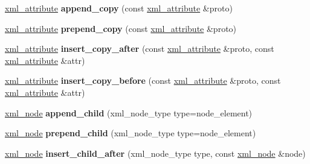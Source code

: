 \begin{DoxyCompactItemize}
\item 
\hypertarget{classpugi_1_1xml__node_a4c151e6665c6bfa614fe80d177fd5396}{}\hyperlink{classpugi_1_1xml__attribute}{xml\+\_\+attribute} {\bfseries append\+\_\+copy} (const \hyperlink{classpugi_1_1xml__attribute}{xml\+\_\+attribute} \&proto)\label{classpugi_1_1xml__node_a4c151e6665c6bfa614fe80d177fd5396}

\item 
\hypertarget{classpugi_1_1xml__node_abd0f80e4d5bc938a27b50d37a0c7865b}{}\hyperlink{classpugi_1_1xml__attribute}{xml\+\_\+attribute} {\bfseries prepend\+\_\+copy} (const \hyperlink{classpugi_1_1xml__attribute}{xml\+\_\+attribute} \&proto)\label{classpugi_1_1xml__node_abd0f80e4d5bc938a27b50d37a0c7865b}

\item 
\hypertarget{classpugi_1_1xml__node_ab5fd2ccada30141544b12c6ef554d8f4}{}\hyperlink{classpugi_1_1xml__attribute}{xml\+\_\+attribute} {\bfseries insert\+\_\+copy\+\_\+after} (const \hyperlink{classpugi_1_1xml__attribute}{xml\+\_\+attribute} \&proto, const \hyperlink{classpugi_1_1xml__attribute}{xml\+\_\+attribute} \&attr)\label{classpugi_1_1xml__node_ab5fd2ccada30141544b12c6ef554d8f4}

\item 
\hypertarget{classpugi_1_1xml__node_ac81f8aded4b53a9b8c98d131986cb535}{}\hyperlink{classpugi_1_1xml__attribute}{xml\+\_\+attribute} {\bfseries insert\+\_\+copy\+\_\+before} (const \hyperlink{classpugi_1_1xml__attribute}{xml\+\_\+attribute} \&proto, const \hyperlink{classpugi_1_1xml__attribute}{xml\+\_\+attribute} \&attr)\label{classpugi_1_1xml__node_ac81f8aded4b53a9b8c98d131986cb535}

\item 
\hypertarget{classpugi_1_1xml__node_a190f4851bb4bc4bb61c89fffb663a9af}{}\hyperlink{classpugi_1_1xml__node}{xml\+\_\+node} {\bfseries append\+\_\+child} (xml\+\_\+node\+\_\+type type=node\+\_\+element)\label{classpugi_1_1xml__node_a190f4851bb4bc4bb61c89fffb663a9af}

\item 
\hypertarget{classpugi_1_1xml__node_a9e0a6dddfe1fefc74bb2b7689376989c}{}\hyperlink{classpugi_1_1xml__node}{xml\+\_\+node} {\bfseries prepend\+\_\+child} (xml\+\_\+node\+\_\+type type=node\+\_\+element)\label{classpugi_1_1xml__node_a9e0a6dddfe1fefc74bb2b7689376989c}

\item 
\hypertarget{classpugi_1_1xml__node_a4dd8d25c02560a2692c43cc4779fb7e3}{}\hyperlink{classpugi_1_1xml__node}{xml\+\_\+node} {\bfseries insert\+\_\+child\+\_\+after} (xml\+\_\+node\+\_\+type type, const \hyperlink{classpugi_1_1xml__node}{xml\+\_\+node} \&node)\label{classpugi_1_1xml__node_a4dd8d25c02560a2692c43cc4779fb7e3}


\end{DoxyCompactItemize}
